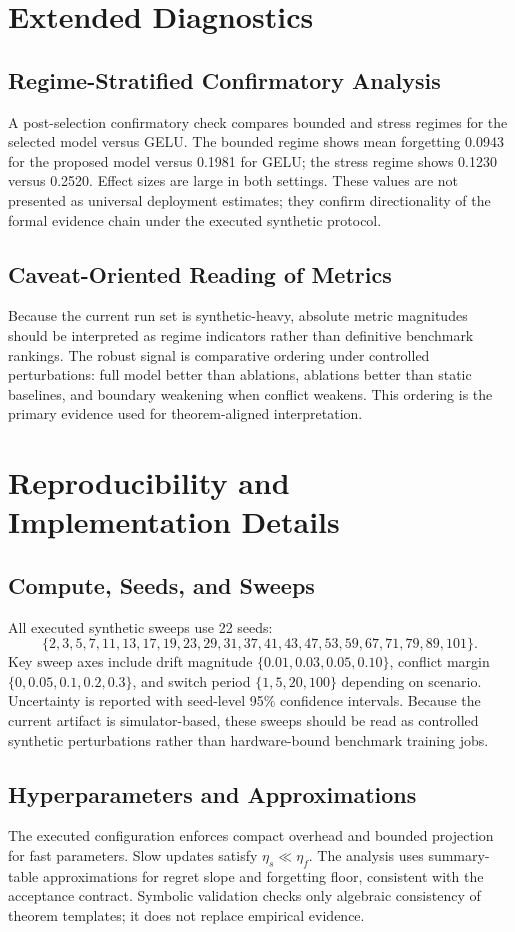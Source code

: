 \documentclass{article} %
\begin{document}
\section{Extended Diagnostics}
\subsection{Regime-Stratified Confirmatory Analysis}
A post-selection confirmatory check compares bounded and stress regimes for the selected model versus GELU. The bounded regime shows mean forgetting 0.0943 for the proposed model versus 0.1981 for GELU; the stress regime shows 0.1230 versus 0.2520. Effect sizes are large in both settings. These values are not presented as universal deployment estimates; they confirm directionality of the formal evidence chain under the executed synthetic protocol.

\subsection{Caveat-Oriented Reading of Metrics}
Because the current run set is synthetic-heavy, absolute metric magnitudes should be interpreted as regime indicators rather than definitive benchmark rankings. The robust signal is comparative ordering under controlled perturbations: full model better than ablations, ablations better than static baselines, and boundary weakening when conflict weakens. This ordering is the primary evidence used for theorem-aligned interpretation.

\section{Reproducibility and Implementation Details}
\subsection{Compute, Seeds, and Sweeps}
All executed synthetic sweeps use 22 seeds:
\[
\{2,3,5,7,11,13,17,19,23,29,31,37,41,43,47,53,59,67,71,79,89,101\}.
\]
Key sweep axes include drift magnitude $\{0.01,0.03,0.05,0.10\}$, conflict margin $\{0,0.05,0.1,0.2,0.3\}$, and switch period $\{1,5,20,100\}$ depending on scenario. Uncertainty is reported with seed-level 95\% confidence intervals. Because the current artifact is simulator-based, these sweeps should be read as controlled synthetic perturbations rather than hardware-bound benchmark training jobs.

\subsection{Hyperparameters and Approximations}
The executed configuration enforces compact overhead and bounded projection for fast parameters. Slow updates satisfy $\eta_s\ll\eta_f$. The analysis uses summary-table approximations for regret slope and forgetting floor, consistent with the acceptance contract. Symbolic validation checks only algebraic consistency of theorem templates; it does not replace empirical evidence.
\end{document}
